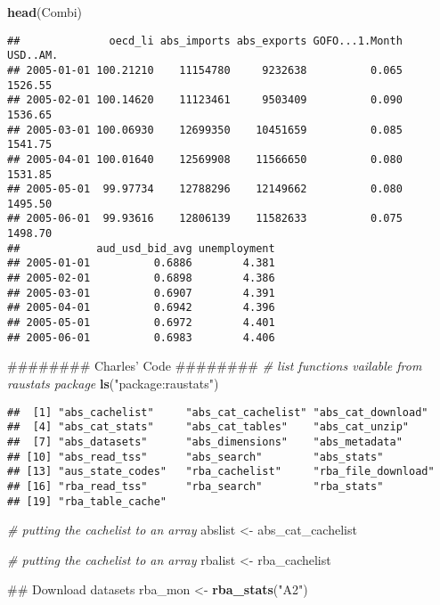 \documentclass[]{article}
\newenvironment{Shaded}{\begin{snugshade}}{\end{snugshade}}
\newcommand{\KeywordTok}[1]{\textcolor[rgb]{0.13,0.29,0.53}{\textbf{#1}}}
\newcommand{\StringTok}[1]{\textcolor[rgb]{0.31,0.60,0.02}{#1}}
\newcommand{\CommentTok}[1]{\textcolor[rgb]{0.56,0.35,0.01}{\textit{#1}}}
\newcommand{\NormalTok}[1]{#1}
\begin{document}
\begin{Shaded}
\begin{Highlighting}[]
\KeywordTok{head}\NormalTok{(Combi)}
\end{Highlighting}
\end{Shaded}

\begin{verbatim}
##              oecd_li abs_imports abs_exports GOFO...1.Month USD..AM.
## 2005-01-01 100.21210    11154780     9232638          0.065  1526.55
## 2005-02-01 100.14620    11123461     9503409          0.090  1536.65
## 2005-03-01 100.06930    12699350    10451659          0.085  1541.75
## 2005-04-01 100.01640    12569908    11566650          0.080  1531.85
## 2005-05-01  99.97734    12788296    12149662          0.080  1495.50
## 2005-06-01  99.93616    12806139    11582633          0.075  1498.70
##            aud_usd_bid_avg unemployment
## 2005-01-01          0.6886        4.381
## 2005-02-01          0.6898        4.386
## 2005-03-01          0.6907        4.391
## 2005-04-01          0.6942        4.396
## 2005-05-01          0.6972        4.401
## 2005-06-01          0.6983        4.406
\end{verbatim}

\begin{Shaded}
\begin{Highlighting}[]
\NormalTok{######## Charles' Code ########}
  \CommentTok{# list functions vailable from raustats package}
  \KeywordTok{ls}\NormalTok{(}\StringTok{"package:raustats"}\NormalTok{)}
\end{Highlighting}
\end{Shaded}

\begin{verbatim}
##  [1] "abs_cachelist"     "abs_cat_cachelist" "abs_cat_download" 
##  [4] "abs_cat_stats"     "abs_cat_tables"    "abs_cat_unzip"    
##  [7] "abs_datasets"      "abs_dimensions"    "abs_metadata"     
## [10] "abs_read_tss"      "abs_search"        "abs_stats"        
## [13] "aus_state_codes"   "rba_cachelist"     "rba_file_download"
## [16] "rba_read_tss"      "rba_search"        "rba_stats"        
## [19] "rba_table_cache"
\end{verbatim}

\begin{Shaded}
\begin{Highlighting}[]
  \CommentTok{# putting the cachelist to an array}
\NormalTok{  abslist <-}\StringTok{ }\NormalTok{abs_cat_cachelist}
  
  \CommentTok{# putting the cachelist to an array}
\NormalTok{  rbalist <-}\StringTok{ }\NormalTok{rba_cachelist}
  
\NormalTok{  ## Download datasets}
\NormalTok{  rba_mon <-}\StringTok{ }\KeywordTok{rba_stats}\NormalTok{(}\StringTok{"A2"}\NormalTok{)}
\end{Highlighting}
\end{Shaded}
\end{document}
